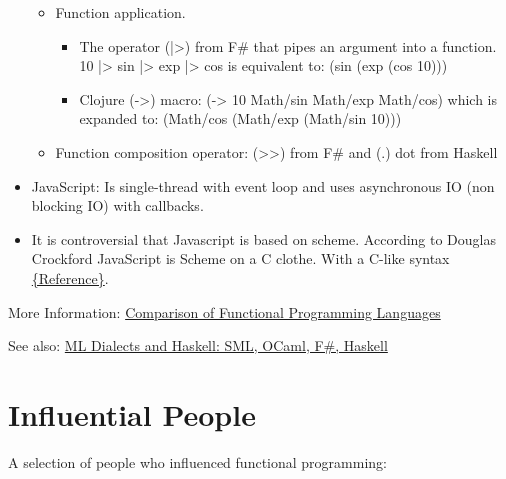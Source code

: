\documentclass[11pt]{article}
\begin{document}
\begin{itemize}
\begin{itemize}
\item Function application.

\begin{itemize}
\item The operator (|>) from F\# that pipes an argument into a
function.  10 |> sin |> exp |> cos is equivalent to:  (sin (exp (cos 10)))

\item Clojure (->) macro: (-> 10 Math/sin Math/exp Math/cos) which is
expanded to: (Math/cos (Math/exp (Math/sin 10)))
\end{itemize}

\item Function composition operator:  (>>) from F\# and (.) dot from
Haskell
\end{itemize}

\item JavaScript: Is single-thread with event loop and uses
asynchronous IO (non blocking IO) with callbacks.

\item It is controversial that Javascript is based on scheme. According
to Douglas Crockford JavaScript is Scheme on a C clothe. With a
C-like syntax \href{http://www.crockford.com/javascript/little.html}{\{Reference\}}.
\end{itemize}

More Information: \href{http://en.wikipedia.org/wiki/Comparison_of_functional_programming_languages}{Comparison of Functional Programming Languages}

See also: \href{http://hyperpolyglot.org/ml}{ML Dialects and Haskell: SML, OCaml, F\#, Haskell} 

\section{Influential People}
\label{sec-3}

A selection of people who influenced functional programming:
\end{document}
